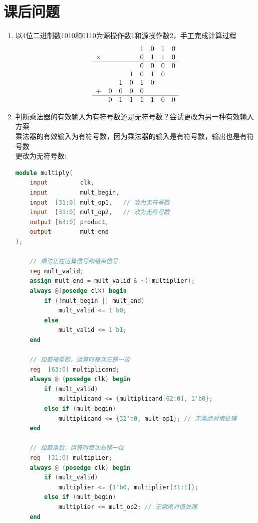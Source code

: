 \documentclass[AutoFakeBold]{LZUThesis}
\begin{document}
\section{课后问题}
\begin{enumerate}
    \item 以4位二进制数1010和0110为源操作数1和源操作数2，手工完成计算过程
    \[
    \begin{array}{ c c c c c c c c }
        & & & & 1 & 0 & 1 & 0 \\
        \times & & & & 0 & 1 & 1 & 0 \\
        \hline
        & & & & 0 & 0 & 0 & 0 \\
        & & & 1 & 0 & 1 & 0 & \\
        & & 1 & 0 & 1 & 0 &  &  \\
        + & 0 & 0 & 0 & 0 & & & \\
        \hline
        & 0 & 1 & 1 & 1 & 1 & 0 & 0
    \end{array}
    \]
    \item 判断乘法器的有效输入为有符号数还是无符号数？尝试更改为另一种有效输入方案 \\
    乘法器的有效输入为有符号数，因为乘法器的输入是有符号数，输出也是有符号数 \\
    更改为无符号数: \\
    \begin{lstlisting}[language=Verilog]
module multiply(
    input         clk,
    input         mult_begin,
    input  [31:0] mult_op1,   // 改为无符号数
    input  [31:0] mult_op2,   // 改为无符号数
    output [63:0] product,
    output        mult_end
);

    // 乘法正在运算信号和结束信号
    reg mult_valid;
    assign mult_end = mult_valid & ~(|multiplier);
    always @(posedge clk) begin
        if (!mult_begin || mult_end)
            mult_valid <= 1'b0;
        else
            mult_valid <= 1'b1;
    end

    // 加载被乘数，运算时每次左移一位
    reg  [63:0] multiplicand;
    always @ (posedge clk) begin
        if (mult_valid)
            multiplicand <= {multiplicand[62:0], 1'b0};
        else if (mult_begin)
            multiplicand <= {32'd0, mult_op1}; // 无需绝对值处理
    end

    // 加载乘数，运算时每次右移一位
    reg  [31:0] multiplier;
    always @ (posedge clk) begin
        if (mult_valid)
            multiplier <= {1'b0, multiplier[31:1]}; 
        else if (mult_begin)
            multiplier <= mult_op2; // 无需绝对值处理
    end
    

\end{lstlisting}
\end{enumerate}
\end{document}
